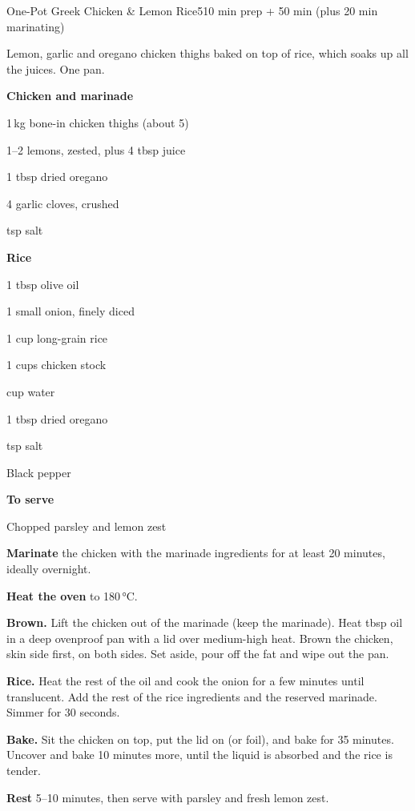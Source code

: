 \begin{recipebox}{One-Pot Greek Chicken \& Lemon Rice}{5}{10 min prep + 50 min (plus 20 min marinating)}

Lemon, garlic and oregano chicken thighs baked on top of rice, which soaks up
all the juices. One pan.

\begin{ingredients}
  \item[] \textbf{Chicken and marinade}
  \item 1\,kg bone-in chicken thighs (about 5)
  \item 1--2 lemons, zested, plus 4 tbsp juice
  \item 1 tbsp dried oregano
  \item 4 garlic cloves, crushed
  \item {} tsp salt
  \item[] \textbf{Rice}
  \item 1 tbsp olive oil
  \item 1 small onion, finely diced
  \item 1 cup long-grain rice
  \item 1 cups chicken stock
  \item {} cup water
  \item 1 tbsp dried oregano
  \item {} tsp salt
  \item Black pepper
  \item[] \textbf{To serve}
  \item Chopped parsley and lemon zest
\end{ingredients}

\begin{method}
  \item \textbf{Marinate} the chicken with the marinade ingredients for at least 20
        minutes, ideally overnight.
  \item \textbf{Heat the oven} to 180\,°C.
  \item \textbf{Brown.} Lift the chicken out of the marinade (keep the marinade). Heat
         tbsp oil in a deep ovenproof pan with a lid over medium-high
        heat. Brown the chicken, skin side first, on both sides. Set aside, pour off
        the fat and wipe out the pan.
  \item \textbf{Rice.} Heat the rest of the oil and cook the onion for a few minutes
        until translucent. Add the rest of the rice ingredients and the reserved
        marinade. Simmer for 30 seconds.
  \item \textbf{Bake.} Sit the chicken on top, put the lid on (or foil), and bake for
        35 minutes. Uncover and bake 10 minutes more, until the liquid is absorbed
        and the rice is tender.
  \item \textbf{Rest} 5--10 minutes, then serve with parsley and fresh lemon zest.
\end{method}


\end{recipebox}
